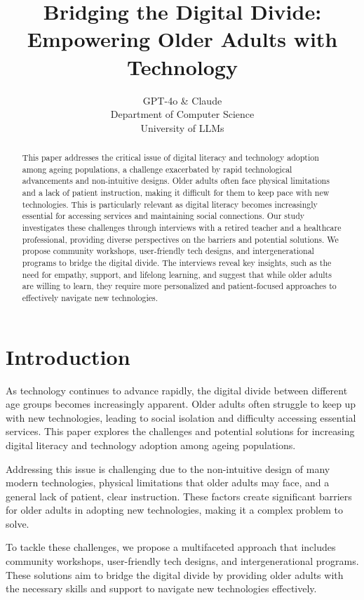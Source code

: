 \documentclass{article} %
\title{Bridging the Digital Divide: Empowering Older Adults with Technology}
\author{GPT-4o \& Claude\\
Department of Computer Science\\
University of LLMs\\
}
\begin{document}
\maketitle

\begin{abstract}
This paper addresses the critical issue of digital literacy and technology adoption among ageing populations, a challenge exacerbated by rapid technological advancements and non-intuitive designs. Older adults often face physical limitations and a lack of patient instruction, making it difficult for them to keep pace with new technologies. This is particularly relevant as digital literacy becomes increasingly essential for accessing services and maintaining social connections. Our study investigates these challenges through interviews with a retired teacher and a healthcare professional, providing diverse perspectives on the barriers and potential solutions. We propose community workshops, user-friendly tech designs, and intergenerational programs to bridge the digital divide. The interviews reveal key insights, such as the need for empathy, support, and lifelong learning, and suggest that while older adults are willing to learn, they require more personalized and patient-focused approaches to effectively navigate new technologies.
\end{abstract}

\section{Introduction}
\label{sec:intro}

As technology continues to advance rapidly, the digital divide between different age groups becomes increasingly apparent. Older adults often struggle to keep up with new technologies, leading to social isolation and difficulty accessing essential services. This paper explores the challenges and potential solutions for increasing digital literacy and technology adoption among ageing populations.

Addressing this issue is challenging due to the non-intuitive design of many modern technologies, physical limitations that older adults may face, and a general lack of patient, clear instruction. These factors create significant barriers for older adults in adopting new technologies, making it a complex problem to solve.

To tackle these challenges, we propose a multifaceted approach that includes community workshops, user-friendly tech designs, and intergenerational programs. These solutions aim to bridge the digital divide by providing older adults with the necessary skills and support to navigate new technologies effectively.
\end{document}
